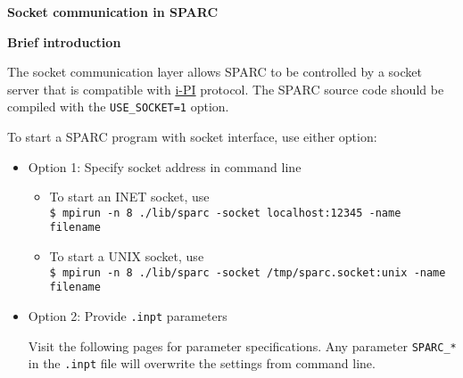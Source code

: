 
\begin{frame}[allowframebreaks,c]{} \label{Socket}

\begin{center}
\Huge \textbf{Socket communication in SPARC}
\end{center}

\end{frame}

\begin{frame}[allowframebreaks]{\textbf{Brief introduction}} \label{SOCKET_INTRO}
  
  The socket communication layer allows SPARC to be controlled by a socket server that is compatible with
  \href{https://ipi-code.org/i-pi/introduction.html}{i-PI} protocol. The SPARC source code should be compiled with the
  \texttt{USE\_SOCKET=1} option. 

  To start a SPARC program with socket interface, use either option:
  \begin{itemize}
  \item Option 1: Specify socket address in command line
\begin{itemize}
    \item To start an INET socket, use\\
    \texttt{\$ mpirun -n 8 ./lib/sparc -socket localhost:12345 -name filename}

    \item To start a UNIX socket, use\\
    \texttt{\$ mpirun -n 8 ./lib/sparc -socket /tmp/sparc.socket:unix -name filename}
  \end{itemize}
    
  \item Option 2: Provide \texttt{.inpt} parameters

    Visit the following pages for parameter specifications.
    Any parameter \texttt{SPARC\_*} in the \texttt{.inpt} file
    will overwrite the settings from command line.
  \end{itemize}

\end{frame}

